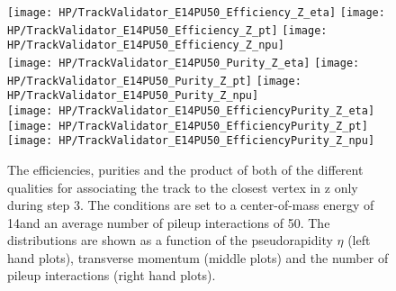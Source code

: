 \begin{figure}[!h]
  \centering
  \texttt{[image: HP/TrackValidator\_E14PU50\_Efficiency\_Z\_eta]}
  \texttt{[image: HP/TrackValidator\_E14PU50\_Efficiency\_Z\_pt]}
  \texttt{[image: HP/TrackValidator\_E14PU50\_Efficiency\_Z\_npu]}
   \\
  \texttt{[image: HP/TrackValidator\_E14PU50\_Purity\_Z\_eta]}
  \texttt{[image: HP/TrackValidator\_E14PU50\_Purity\_Z\_pt]}
  \texttt{[image: HP/TrackValidator\_E14PU50\_Purity\_Z\_npu]}
   \\
  \texttt{[image: HP/TrackValidator\_E14PU50\_EfficiencyPurity\_Z\_eta]}
  \texttt{[image: HP/TrackValidator\_E14PU50\_EfficiencyPurity\_Z\_pt]}
  \texttt{[image: HP/TrackValidator\_E14PU50\_EfficiencyPurity\_Z\_npu]}
  \caption[Efficiencies, purities and their product of the different qualities of the association map with associating the track to the closest vertex in z only during step 3 with 14\TeV and $\left<PU\right>=50$]{The efficiencies, purities and the product of both of the different qualities for associating the track to the closest vertex in z only during step 3. The conditions are set to a center-of-mass energy of 14\TeV and an average number of pileup interactions of 50. The distributions are shown as a function of the pseudorapidity $\eta$ (left hand plots), transverse momentum (middle plots) and the number of pileup interactions (right hand plots).}
\end{figure}
\clearpage


